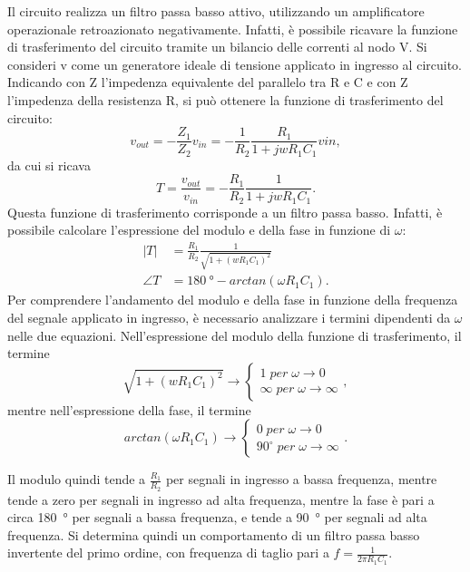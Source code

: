 Il circuito realizza un filtro passa basso attivo, utilizzando un amplificatore operazionale retroazionato negativamente. Infatti, è possibile ricavare la funzione di trasferimento del circuito tramite un bilancio delle correnti al nodo V\super{-}. Si consideri v come un generatore ideale di tensione applicato in ingresso al circuito. Indicando con Z l'impedenza equivalente del parallelo tra R e C e con Z l'impedenza della resistenza R, si può ottenere la funzione di trasferimento del circuito:
\begin{equation}
	v_{out}=-\frac{Z_1}{Z_2}v_{in}=-\frac{1}{R_2}\frac{R_1}{1+j w R_1 C_1} vin,
\end{equation}
da cui si ricava
\begin{equation}
	T=\frac{v_{out}}{v_{in}}=-\frac{R_1}{R_2}\frac{1}{1+j w R_1 C_1}.
\end{equation}
Questa funzione di trasferimento corrisponde a un filtro passa basso. Infatti, è possibile calcolare l'espressione del modulo e della fase in funzione di $\omega$:
\begin{equation}
	\begin{split}
		|T|&=\frac{R_1}{R_2}\frac{1}{\sqrt{1+(wR_1C_1)^2}} \\
		\angle T&=\SI{180}{\degree}-arctan(\omega R_1 C_1).
	\end{split}
\end{equation}
Per comprendere l'andamento del modulo e della fase in funzione della frequenza del segnale applicato in ingresso, è necessario analizzare i termini dipendenti da $\omega$ nelle due equazioni. Nell'espressione del modulo della funzione di trasferimento, il termine 
\begin{equation}
	\sqrt{1+(wR_1C_1)^2} \to
	\begin{cases}
		1 \; per \; \omega \to 0 \\
		\infty \; per \; \omega \to \infty
	\end{cases}
,
\end{equation}
mentre nell'espressione della fase, il termine
\begin{equation}
	arctan(\omega R_1 C_1) \to
	\begin{cases}
		0 \; per \; \omega \to 0 \\
		90^\circ \; per \; \omega \to \infty
	\end{cases}
	.
\end{equation}


Il modulo quindi tende a $\frac{R_1}{R_2}$ per segnali in ingresso a bassa frequenza, mentre tende a zero per segnali in ingresso ad alta frequenza, mentre la fase è pari a circa \SI{180}{\degree} per segnali a bassa frequenza, e tende a \SI{90}{\degree} per segnali ad alta frequenza.
Si determina quindi un comportamento di un filtro passa basso invertente del primo ordine, con frequenza di taglio pari a $f=\frac{1}{2\pi R_1C_1}$.


